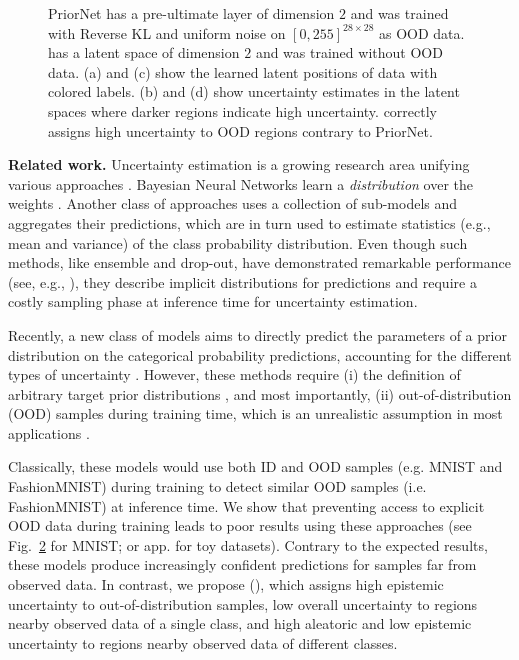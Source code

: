 \begin{figure}[ht!]
\begin{subfigure}[t]{0.23\columnwidth}
        \label{ours_visualization_unc}
    \end{subfigure}%
    \caption{PriorNet has a pre-ultimate layer of dimension $2$ and was trained with Reverse KL and uniform noise on $[0,255]^{28\times28}$ as OOD data. \PostNetacro has a latent space of dimension $2$ and was trained without OOD data. (a) and (c) show the learned latent positions of data with colored labels. (b) and (d) show uncertainty estimates in the latent spaces where darker regions indicate high uncertainty. \PostNetacro correctly assigns high uncertainty to OOD regions contrary to PriorNet.}
    \label{fig:mnist_2D_latent_space}
	\vspace{-.5cm}
\end{figure}

\textbf{Related work.} Uncertainty estimation is a growing research area unifying various approaches \cite{uncertainty_on_weigths, simple_baseline_uncertainty, practical_deep_bayesian_principles, power_certainty, ensemble_simple, drop_out}. Bayesian Neural Networks learn a \emph{distribution} over the weights \cite{uncertainty_on_weigths, simple_baseline_uncertainty, practical_deep_bayesian_principles}. Another class of approaches uses a collection of sub-models and aggregates their predictions, which are in turn used to estimate statistics (e.g., mean and variance) of the class probability distribution. Even though such methods, like ensemble and drop-out, have demonstrated remarkable performance (see, e.g., \cite{uncertainty_survey}), they describe implicit distributions for predictions and require a costly sampling phase at inference time for uncertainty estimation. 

Recently, a new class of models aims to directly predict the parameters of a prior distribution on the categorical probability predictions, accounting for the different types of uncertainty \cite{prior_net, rev_kl_prior_net, evidential_uncertainty, uncertainty_time}. However, these methods require (i) the definition of arbitrary target prior distributions \cite{prior_net, rev_kl_prior_net, evidential_uncertainty}, and most importantly, (ii) out-of-distribution (OOD) samples during training time, which is an unrealistic assumption in most applications \cite{prior_net, rev_kl_prior_net}.

Classically, these models would use both ID and OOD samples (e.g. MNIST and FashionMNIST) during training to detect similar OOD samples (i.e. FashionMNIST) at inference time. We show that preventing access to explicit OOD data during training leads to poor results using these approaches (see Fig.~\ref{fig:mnist_2D_latent_space} for MNIST; or app. for toy datasets). Contrary to the expected results, these models produce increasingly confident predictions for samples far from observed data. In contrast, we propose \PostNet (\PostNetacro), which assigns high epistemic uncertainty to out-of-distribution samples, low overall uncertainty to regions nearby observed data of a single class, and high aleatoric and low epistemic uncertainty to regions nearby observed data of different classes.

